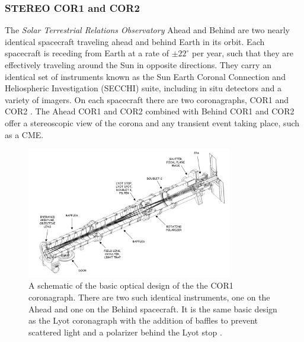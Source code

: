 \subsubsection{STEREO COR1 and COR2}\label{sec:22}
The \emph{Solar Terrestrial Relations Observatory} \citep[\emph{STEREO};][]{kai08} Ahead and Behind are two nearly identical spacecraft traveling ahead and behind Earth in its orbit. Each spacecraft is receding from Earth at a rate of $\pm22^{\circ}$ per year, such that they are effectively traveling around the Sun in opposite directions. They carry an identical set of instruments known as the Sun Earth Coronal Connection and Heliospheric Investigation (SECCHI) suite, including in situ detectors and a variety of imagers. On each spacecraft there are two coronagraphs, COR1 and COR2 \citep{how08}. The Ahead COR1 and COR2 combined with Behind COR1 and COR2 offer a stereoscopic view of the corona and any transient event taking place, such as a CME.
\begin{figure}[!t]
\begin{center}
\includegraphics[width=0.8\textwidth]{images/COR1_design}
\caption[The COR1 coronagraph]{A schematic of the basic optical design of the the COR1 coronagraph. There are two such identical instruments, one on the Ahead and one on the Behind spacecraft. It is the same basic design as the Lyot coronagraph with the addition of baffles to prevent scattered light and a polarizer behind the Lyot stop \citep{thomp2008}.}
\label{fig:COR1_design}
\end{center}
\end{figure}
